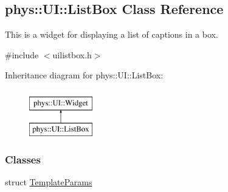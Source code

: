 \hypertarget{classphys_1_1UI_1_1ListBox}{
\subsection{phys::UI::ListBox Class Reference}
\label{classphys_1_1UI_1_1ListBox}
}


This is a widget for displaying a list of captions in a box.  




{\ttfamily \#include $<$uilistbox.h$>$}

Inheritance diagram for phys::UI::ListBox:\begin{figure}[H]
\begin{center}
\leavevmode
\includegraphics[height=2.000000cm]{classphys_1_1UI_1_1ListBox}
\end{center}
\end{figure}
\subsubsection*{Classes}
\begin{DoxyCompactItemize}
\item 
struct \hyperlink{structphys_1_1UI_1_1ListBox_1_1TemplateParams}{TemplateParams}
\end{DoxyCompactItemize}

